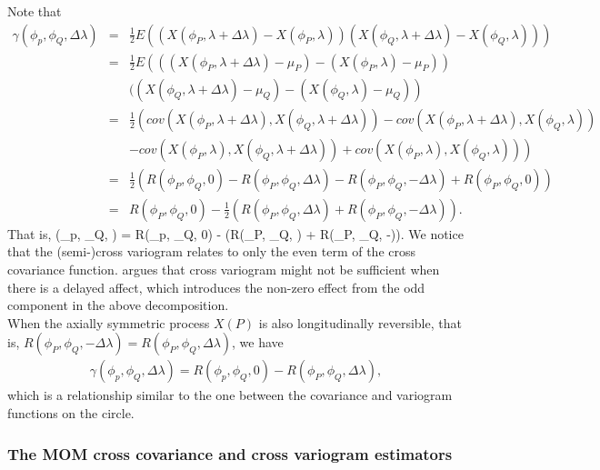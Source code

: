 Note that
\begin{eqnarray*}
\gamma(\phi_p, \phi_Q, \Delta\lambda) &=& \frac{1}{2}E\left((X(\phi_P, \lambda+\Delta \lambda) - X(\phi_P, \lambda))(X(\phi_Q, \lambda+\Delta \lambda) - X(\phi_Q, \lambda))\right) \\
&=& \frac{1}{2} E\left(((X(\phi_P, \lambda+\Delta \lambda) - \mu_P) - (X(\phi_P, \lambda)- \mu_P)) \right. \\
& & \left.((X(\phi_Q, \lambda+\Delta \lambda) - \mu_Q) - (X(\phi_Q, \lambda) - \mu_Q)\right) \\
&=& \frac{1}{2} \left(cov(X(\phi_P, \lambda+\Delta \lambda), X(\phi_Q, \lambda+\Delta \lambda)) - cov(X(\phi_P, \lambda+\Delta \lambda), X(\phi_Q, \lambda)) \right. \\
& & \left. - cov(X(\phi_P, \lambda), X(\phi_Q, \lambda + \Delta \lambda)) + cov(X(\phi_P, \lambda), X(\phi_Q, \lambda))  \right) \\
&=& \frac{1}{2} \left(R(\phi_P, \phi_Q, 0) - R(\phi_P, \phi_Q, \Delta \lambda) - R(\phi_P, \phi_Q, -\Delta \lambda) + R(\phi_P, \phi_Q, 0)  \right) \\
&=& R(\phi_P, \phi_Q, 0) - \frac{1}{2}(R(\phi_P, \phi_Q, \Delta \lambda) + R(\phi_P, \phi_Q, -\Delta \lambda)).
\end{eqnarray*}
That is, 				
\beq
\gamma(\phi_p, \phi_Q, \Delta\lambda) =  R(\phi_p, \phi_Q, 0) - (R(\phi_P, \phi_Q, \Delta \lambda) + R(\phi_P, \phi_Q, -\Delta \lambda)).
\eeq
We notice that the (semi-)cross variogram relates to only the even term of the cross covariance function. \cite{Wackernagel2013} argues that cross variogram might not be sufficient when there is a delayed affect, which introduces the non-zero effect from the odd component in the above decomposition. \\

When the axially symmetric process $X(P)$ is also longitudinally reversible, that is, $R(\phi_P, \phi_Q, -\Delta \lambda) = R(\phi_P, \phi_Q, \Delta \lambda)$, we have
\begin{eqnarray*}
\gamma(\phi_p, \phi_Q, \Delta\lambda) =  R(\phi_p, \phi_Q, 0) - R(\phi_P, \phi_Q, \Delta \lambda),
\end{eqnarray*}  
which is a relationship similar to the one between the covariance and variogram functions on the circle. \\

\subsubsection{\bf The MOM cross covariance and cross variogram estimators}

